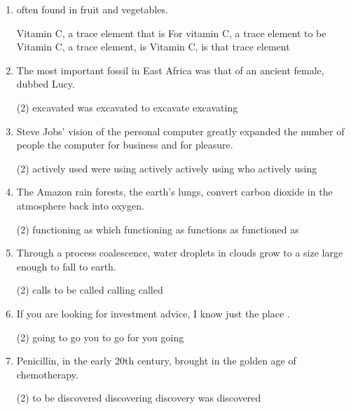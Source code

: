 \begin{enumerate}
\item \ttu often found in fruit and vegetables.
\begin{tasks}
  \task Vitamin C, a trace element that is
  \task For vitamin C, a trace element to be
  \task Vitamin C, a trace element, is
  \task Vitamin C, is that trace element
\end{tasks}

\item The most important fossil \ttu in East Africa was that of an ancient female, dubbed Lucy.
\begin{tasks}(2)
  \task excavated
  \task was excavated
  \task to excavate
  \task excavating
\end{tasks}

\item Steve Jobs' vision of the personal computer greatly expanded the number of people \ttu the computer for business and for pleasure.
\begin{tasks}(2)
  \task actively used
  \task were using actively
  \task actively using
  \task who actively using
\end{tasks}

\item The Amazon rain forests, \ttu the earth's lungs, convert carbon dioxide in the atmosphere back into oxygen.
\begin{tasks}(2)
  \task functioning as
  \task which functioning as
  \task functions as
  \task functioned as
\end{tasks}

\item Through a process \ttu coalescence, water droplets in clouds grow to a size large enough to fall to earth.
\begin{tasks}(2)
  \task calls
  \task to be called
  \task calling
  \task called
\end{tasks}

\item If you are looking for investment advice, I know just the place \ttu.
\begin{tasks}(2)
  \task going
  \task to go
  \task you to go
  \task for you going
\end{tasks}

\item Penicillin, \ttu in the early 20th century, brought in the golden age of chemotherapy.
\begin{tasks}(2)
  \task to be discovered
  \task discovering
  \task discovery was
  \task discovered
\end{tasks}


\end{enumerate}
